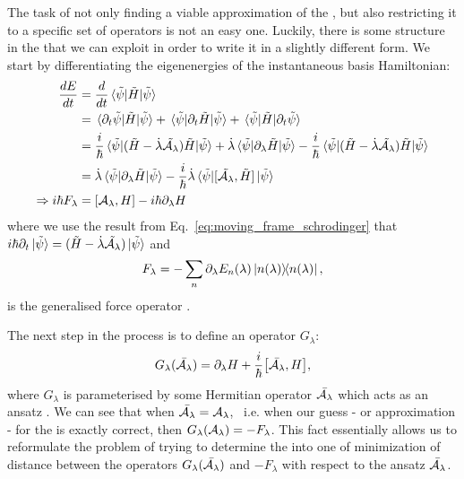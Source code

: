     The task of not only finding a viable approximation of the , but also restricting it to a specific set of operators is not an easy one. Luckily, there is some structure in the  that we can exploit in order to write it in a slightly different form. We start by differentiating the eigenenergies of the instantaneous basis Hamiltonian:
    \begin{equation}\label{eq:energy_derivative}
        \begin{aligned}
            \frac{dE}{dt} &= \frac{d}{dt}\ev*{\Tilde{H}}{\Tilde{\psi}} \\
            &= \mel*{\partial_t \Tilde{\psi}}{\Tilde{H}}{\Tilde{\psi}} + \mel*{\Tilde{\psi}}{\partial_t \Tilde{H}}{\Tilde{\psi}} + \mel*{\Tilde{\psi}}{\Tilde{H}}{\partial_t \Tilde{\psi}} \\
            &= \frac{i}{\hbar}\ev*{(\Tilde{H} - \dotlambda \Tilde{\AGP{\lambda}})\Tilde{H}}{\Tilde{\psi}} + \dotlambda \ev*{\dlambda \Tilde{H}}{\Tilde{\psi}} - \frac{i}{\hbar}\ev*{(\Tilde{H} - \dotlambda \Tilde{\AGP{\lambda}})\Tilde{H}}{\Tilde{\psi}}\\
            &= \dotlambda \ev*{\dlambda \Tilde{H}}{\Tilde{\psi}} - \frac{i}{\hbar} \dotlambda \ev*{\comm*{\Tilde{\AGP{\lambda}}}{\Tilde{H}}}{\Tilde{\psi}} \\
            \Rightarrow i\hbar F_{\lambda} &= \comm{\AGP{\lambda}}{H} - i \hbar \dlambda H
        \end{aligned}
    \end{equation}
    where we use the result from Eq.~\eqref{eq:moving_frame_schrodinger} that $i\hbar \partial_t \ket*{\Tilde{\psi}} = (\Tilde{H} - \dot{\lambda} \Tilde{\mathcal{A}_{\lambda}})\ket*{\Tilde{\psi}}$ and
    \begin{equation}\label{eq:generalized_force_operator}
        F_{\lambda} = - \sum_n \dlambda E_n(\lambda) \dyad{n(\lambda)},
    \end{equation}
    is the generalised force operator \cite{kolodrubetz_geometry_2017,sels_minimizing_2017,jarzynski_generating_2013}. 

    The next step in the process is to define an operator $G_{\lambda}$:
    \begin{equation}\label{eq:G_operator}
        G_{\lambda}(\approxAGP) = \dlambda H + \frac{i}{\hbar} \comm{\approxAGP}{H},
    \end{equation}
    where $G_{\lambda}$ is parameterised by some Hermitian operator $\Bar{\mathcal{A}_{\lambda}}$ which acts as an ansatz . We can see that when $\Bar{\mathcal{A}_{\lambda}} = \mathcal{A}_{\lambda}$, \@~i.e. when our guess - or approximation - for the  is exactly correct, then $G_{\lambda}(\mathcal{A}_{\lambda}) = - F_{\lambda}$. This fact essentially allows us to reformulate the problem of trying to determine the  into one of minimization of distance between the operators $G_{\lambda}(\Bar{\mathcal{A}_{\lambda}})$ and $-F_{\lambda}$ with respect to the ansatz $\Bar{\mathcal{A}_{\lambda}}$. 

